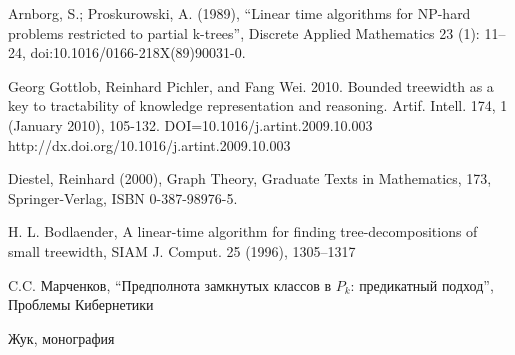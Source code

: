 \documentclass[12pt]{article}
\begin{document}
 Arnborg, S.; Proskurowski, A. (1989), 
``Linear time algorithms for NP-hard problems restricted to partial k-trees'',
Discrete Applied Mathematics 23 (1): 11–24, doi:10.1016/0166-218X(89)90031-0.

Georg Gottlob, Reinhard Pichler, and Fang Wei. 2010. Bounded treewidth as a key to tractability of knowledge representation and reasoning. Artif. Intell. 174, 1 (January 2010), 105-132. DOI=10.1016/j.artint.2009.10.003 http://dx.doi.org/10.1016/j.artint.2009.10.003

Diestel, Reinhard (2000), Graph Theory, Graduate Texts in Mathematics, 
173, Springer-Verlag, ISBN 0-387-98976-5.

H. L. Bodlaender, A linear-time algorithm for finding 
tree-decompositions of small
treewidth, SIAM J. Comput. 25 (1996), 1305–1317

C.C. Марченков, ``Предполнота замкнутых классов в $P_k$: предикатный подход'', Проблемы Кибернетики

Жук, монография

\endthebibliography
\end{document}
